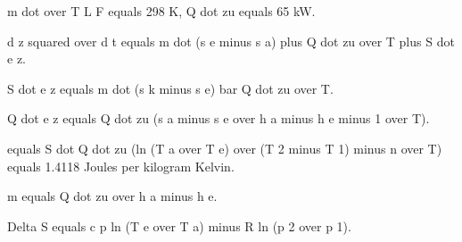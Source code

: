m dot over T L F equals 298 K, Q dot zu equals 65 kW.

d z squared over d t equals m dot (s e minus s a) plus Q dot zu over T plus S dot e z.

S dot e z equals m dot (s k minus s e) bar Q dot zu over T.

Q dot e z equals Q dot zu (s a minus s e over h a minus h e minus 1 over T).

equals S dot Q dot zu (ln (T a over T e) over (T 2 minus T 1) minus n over T) equals 1.4118 Joules per kilogram Kelvin.

m equals Q dot zu over h a minus h e.

Delta S equals c p ln (T e over T a) minus R ln (p 2 over p 1).